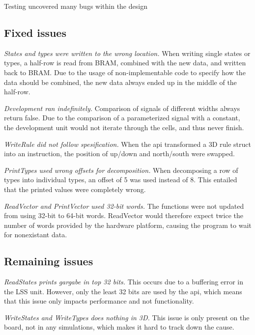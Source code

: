 


Testing uncovered many bugs within the design

\subsection{Fixed issues}

\emph{States and types were written to the wrong location.}
When writing single states or types, a half-row is read from BRAM, combined with the new data, and written back to BRAM.
Due to the usage of non-implementable code to specify how the data should be combined, the new data always ended up in the middle of the half-row.

\emph{Development ran indefinitely.}
Comparison of signals of different widths always return false.
Due to the comparison of a parameterized signal with a constant, the development unit would not iterate through the cells, and thus never finish.

\emph{WriteRule did not follow spesification.}
When the api transformed a 3D rule struct into an instruction, the position of up/down and north/south were swapped.

\emph{PrintTypes used wrong offsets for decomposition.}
When decomposing a row of types into individual types, an offset of 5 was used instead of 8.
This entailed that the printed values were completely wrong.

\emph{ReadVector and PrintVector used 32-bit words.}
The functions were not updated from using 32-bit to 64-bit words.
ReadVector would therefore expect twice the number of words provided by the hardware platform, causing the program to wait for nonexistant data.

\subsection{Remaining issues}

\emph{ReadStates prints gargabe in top 32 bits.}
This occurs due to a buffering error in the LSS unit.
However, only the least 32 bits are used by the api, which means that this issue only impacts performance and not functionality.

\emph{WriteStates and WriteTypes does nothing in 3D.}
This issue is only present on the board, not in any simulations, which makes it hard to track down the cause.

